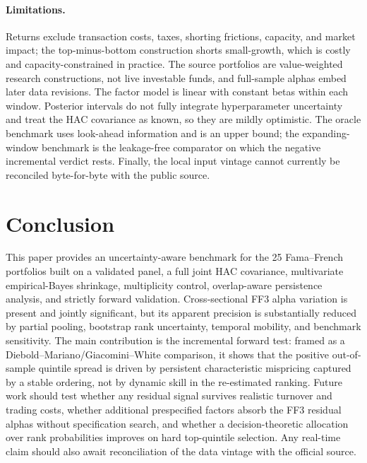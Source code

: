 \documentclass[11pt]{article}
\begin{document}
\paragraph{Limitations.}
Returns exclude transaction costs, taxes, shorting frictions, capacity, and
market impact; the top-minus-bottom construction shorts small-growth, which is
costly and capacity-constrained in practice. The source portfolios are
value-weighted research constructions, not live investable funds, and
full-sample alphas embed later data revisions. The factor model is linear with
constant betas within each window. Posterior intervals do not fully integrate
hyperparameter uncertainty and treat the HAC covariance as known, so they are
mildly optimistic. The oracle benchmark uses look-ahead information and is an
upper bound; the expanding-window benchmark is the leakage-free comparator on
which the negative incremental verdict rests. Finally, the local input vintage
cannot currently be reconciled byte-for-byte with the public source.

\section{Conclusion}\label{sec:conclusion}
This paper provides an uncertainty-aware benchmark for the 25 Fama--French
portfolios built on a validated panel, a full joint HAC covariance, multivariate
empirical-Bayes shrinkage, multiplicity control, overlap-aware persistence
analysis, and strictly forward validation. Cross-sectional FF3 alpha variation
is present and jointly significant, but its apparent precision is substantially
reduced by partial pooling, bootstrap rank uncertainty, temporal mobility, and
benchmark sensitivity. The main contribution is the incremental forward test:
framed as a Diebold--Mariano/Giacomini--White comparison, it shows that the
positive out-of-sample quintile spread is driven by persistent characteristic
mispricing captured by a stable ordering, not by dynamic skill in the
re-estimated ranking. Future work should test whether any residual signal
survives realistic turnover and trading costs, whether additional prespecified
factors absorb the FF3 residual alphas without specification search, and whether
a decision-theoretic allocation over rank probabilities improves on hard
top-quintile selection. Any real-time claim should also await reconciliation of
the data vintage with the official source.
\end{document}
